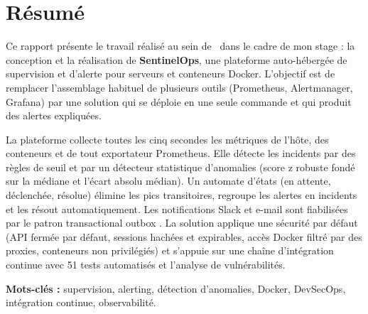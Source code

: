 \chapter*{Résumé}
\thispagestyle{plain}

Ce rapport présente le travail réalisé au sein de \entreprise\ dans le cadre de mon stage :
la conception et la réalisation de \textbf{SentinelOps}, une plateforme auto-hébergée de
supervision et d'alerte pour serveurs et conteneurs Docker. L'objectif est de remplacer
l'assemblage habituel de plusieurs outils (Prometheus, Alertmanager, Grafana) par une
solution qui se déploie en une seule commande et qui produit des alertes expliquées.

La plateforme collecte toutes les cinq secondes les métriques de l'hôte, des conteneurs et
de tout exportateur Prometheus. Elle détecte les incidents par des règles de seuil et par un
détecteur statistique d'anomalies (score z robuste fondé sur la médiane et l'écart absolu
médian). Un automate d'états (en attente, déclenchée, résolue) élimine les pics
transitoires, regroupe les alertes en incidents et les résout automatiquement. Les
notifications Slack et e-mail sont fiabilisées par le patron \og transactional outbox \fg{}.
La solution applique une sécurité par défaut (API fermée par défaut, sessions hachées et
expirables, accès Docker filtré par des proxies, conteneurs non privilégiés) et s'appuie sur
une chaîne d'intégration continue avec 51 tests automatisés et l'analyse de vulnérabilités.

\medskip
\noindent\textbf{Mots-clés :} supervision, alerting, détection d'anomalies, Docker,
DevSecOps, intégration continue, observabilité.

